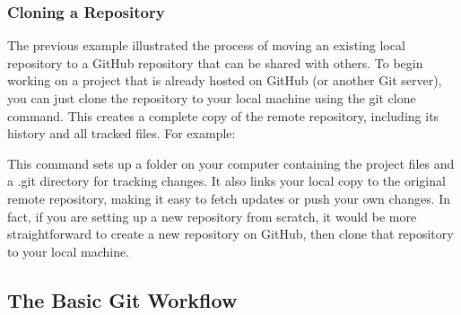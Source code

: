 \subsubsection{Cloning a Repository}
The previous example illustrated the process of moving an existing local repository to a GitHub repository that can be shared with others. To begin working on a project that is already hosted on GitHub (or another Git server), you can just clone the repository to your local machine using the git clone command. This creates a complete copy of the remote repository, including its history and all tracked files. For example:
\begin{terminal}
\end{terminal}
This command sets up a folder on your computer containing the project files and a .git directory for tracking changes. It also links your local copy to the original remote repository, making it easy to fetch updates or push your own changes. In fact, if you are setting up a new repository from scratch, it would be more straightforward to create a new repository on GitHub, then clone that repository to your local machine.

\subsection*{The Basic Git Workflow}

